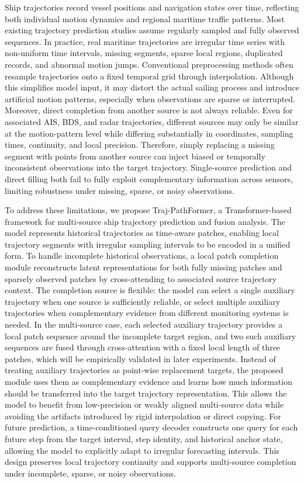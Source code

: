 \documentclass[a4paper,fleqn]{cas-dc}
\begin{document}
Ship trajectories record vessel positions and navigation states over time, reflecting both individual motion dynamics and regional maritime traffic patterns. Most existing trajectory prediction studies assume regularly sampled and fully observed sequences. In practice, real maritime trajectories are irregular time series with non-uniform time intervals, missing segments, sparse local regions, duplicated records, and abnormal motion jumps. Conventional preprocessing methods often resample trajectories onto a fixed temporal grid through interpolation. Although this simplifies model input, it may distort the actual sailing process and introduce artificial motion patterns, especially when observations are sparse or interrupted. Moreover, direct completion from another source is not always reliable. Even for associated AIS, BDS, and radar trajectories, different sources may only be similar at the motion-pattern level while differing substantially in coordinates, sampling times, continuity, and local precision. Therefore, simply replacing a missing segment with points from another source can inject biased or temporally inconsistent observations into the target trajectory. Single-source prediction and direct filling both fail to fully exploit complementary information across sensors, limiting robustness under missing, sparse, or noisy observations.

To address these limitations, we propose Traj-PathFormer, a Transformer-based framework for multi-source ship trajectory prediction and fusion analysis. The model represents historical trajectories as time-aware patches, enabling local trajectory segments with irregular sampling intervals to be encoded in a unified form. To handle incomplete historical observations, a local patch completion module reconstructs latent representations for both fully missing patches and sparsely observed patches by cross-attending to associated source trajectory context. The completion source is flexible: the model can select a single auxiliary trajectory when one source is sufficiently reliable, or select multiple auxiliary trajectories when complementary evidence from different monitoring systems is needed. In the multi-source case, each selected auxiliary trajectory provides a local patch sequence around the incomplete target region, and two such auxiliary sequences are fused through cross-attention with a fixed local length of three patches, which will be empirically validated in later experiments. Instead of treating auxiliary trajectories as point-wise replacement targets, the proposed module uses them as complementary evidence and learns how much information should be transferred into the target trajectory representation. This allows the model to benefit from low-precision or weakly aligned multi-source data while avoiding the artifacts introduced by rigid interpolation or direct copying. For future prediction, a time-conditioned query decoder constructs one query for each future step from the target interval, step identity, and historical anchor state, allowing the model to explicitly adapt to irregular forecasting intervals. This design preserves local trajectory continuity and supports multi-source completion under incomplete, sparse, or noisy observations.
\end{document}
